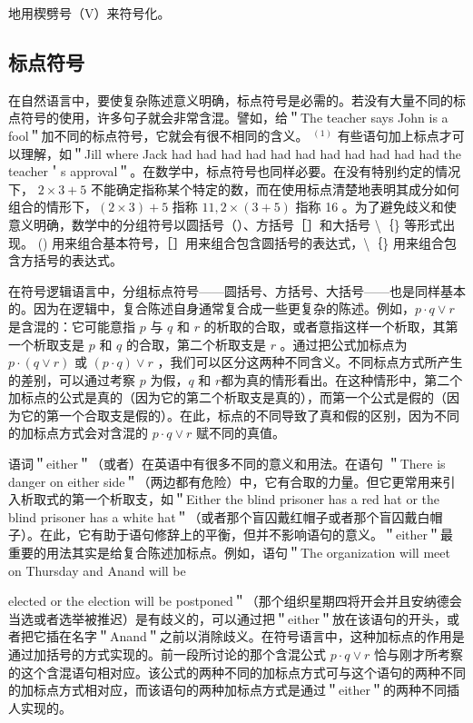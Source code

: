 地用楔劈号（V）来符号化。

\subsection{标点符号}
在自然语言中，要使复杂陈述意义明确，标点符号是必需的。若没有大量不同的标点符号的使用，许多句子就会非常含混。譬如，给＂The teacher says John is a fool＂加不同的标点符号，它就会有很不相同的含义。 ${ }^{(1)}$ 有些语句加上标点才可以理解，如＂Jill where Jack had had had had had had had had had had had the teacher＇s approval＂。在数学中，标点符号也同样必要。在没有特别约定的情况下， $2 \times 3+5$ 不能确定指称某个特定的数，而在使用标点清楚地表明其成分如何组合的情形下，$(2 \times 3)+5$ 指称 $11,2 \times(3+5)$ 指称 16 。为了避免歧义和使意义明确，数学中的分组符号以圆括号（）、方括号［］和大括号 \textbackslash ｛\} 等形式出现。 () 用来组合基本符号，［］用来组合包含圆括号的表达式，\textbackslash ｛\} 用来组合包含方括号的表达式。

在符号逻辑语言中，分组标点符号——圆括号、方括号、大括号——也是同样基本的。因为在逻辑中，复合陈述自身通常复合成一些更复杂的陈述。例如，$p \cdot q \vee r$ 是含混的：它可能意指 $p$ 与 $q$ 和 $r$ 的析取的合取，或者意指这样一个析取，其第一个析取支是 $p$ 和 $q$ 的合取，第二个析取支是 $r$ 。通过把公式加标点为 $p \cdot(q \vee r)$ 或 $(p \cdot q) \vee r$ ，我们可以区分这两种不同含义。不同标点方式所产生的差别，可以通过考察 $p$ 为假，$q$ 和 $r$都为真的情形看出。在这种情形中，第二个加标点的公式是真的（因为它的第二个析取支是真的），而第一个公式是假的（因为它的第一个合取支是假的）。在此，标点的不同导致了真和假的区别，因为不同的加标点方式会对含混的 $p \cdot q \vee r$ 赋不同的真值。

语词＂either＂（或者）在英语中有很多不同的意义和用法。在语句 ＂There is danger on either side＂（两边都有危险）中，它有合取的力量。但它更常用来引入析取式的第一个析取支，如＂Either the blind prisoner has a red hat or the blind prisoner has a white hat＂（或者那个盲囚戴红帽子或者那个盲囚戴白帽子）。在此，它有助于语句修辞上的平衡，但并不影响语句的意义。＂either＂最重要的用法其实是给复合陈述加标点。例如，语句＂The organization will meet on Thursday and Anand will be

elected or the election will be postponed＂（那个组织星期四将开会并且安纳德会当选或者选举被推迟）是有歧义的，可以通过把＂either＂放在该语句的开头，或者把它插在名字＂Anand＂之前以消除歧义。在符号语言中，这种加标点的作用是通过加括号的方式实现的。前一段所讨论的那个含混公式 $p \cdot q \vee r$ 恰与刚才所考察的这个含混语句相对应。该公式的两种不同的加标点方式可与这个语句的两种不同的加标点方式相对应，而该语句的两种加标点方式是通过＂either＂的两种不同插人实现的。

